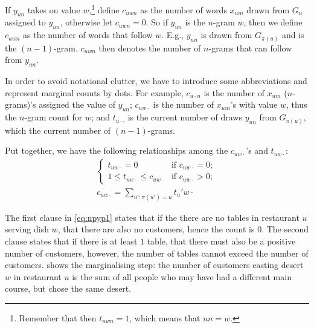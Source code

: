 If $y_{un}$ takes on value $w$,\footnote{Remember that then $t_{uwn}=1$, which means that $un=w$.} define $c_{uwn}$ as the number of words $x_{um}$ drawn from $G_u$ assigned to $y_{un}$, otherwise let $c_{uwn} = 0$. So if $y_{un}$ is the $n$-gram $w$, then we define $c_{uwn}$ as the number of words that follow $w$. E.g., $y_{un}$ is drawn from $G_{\pi(u)}$ and is the $(n-1)$-gram. $c_{uwn}$ then denotes the number of $n$-grams that can follow from $y_{un}$.

In order to avoid notational clutter, we have to introduce some abbreviations and represent marginal counts by dots. For example, $c_{u\cdot n}$ is the number of $x_{um}$ ($n$-grams)'s assigned the value of $y_{un}$; $c_{uw\cdot}$ is the number of $x_{um}$'s with value $w$, thus the $n$-gram count for $w$; and $t_{u\cdot\cdot}$ is the current number of draws $y_{un}$ from $G_{\pi(u)}$, which the current number of $(n-1)$-grams.

Put together, we have the following relationships among the $c_{uw\cdot}$'s and $t_{uw\cdot}$:
\begin{align}
	\begin{cases}
    	t_{uw\cdot} = 0 & \text{if }c_{uw\cdot}=0;\\
        1\leq t_{uw\cdot}\leq c_{uw\cdot} & \text{if }c_{uw\cdot} > 0;
    \end{cases} \label{eq:npyp1}\\
    c_{uw\cdot} = \sum_{u':\pi(u')=u} t_u'w\cdot\label{eq:npyp2}
\end{align}

The first clause in \cref{eq:npyp1} states that if the there are no tables in restaurant $u$ serving dish $w$, that there are also no customers, hence the count is $0$. The second clause states that if there is at least $1$ table, that there must also be a positive number of customers, however, the number of tables cannot exceed the number of customers.
 shows the marginalising step: the number of customers easting desert $w$ in restaurant $u$ is the sum of all people who may have had a different main course, but chose the same desert.





